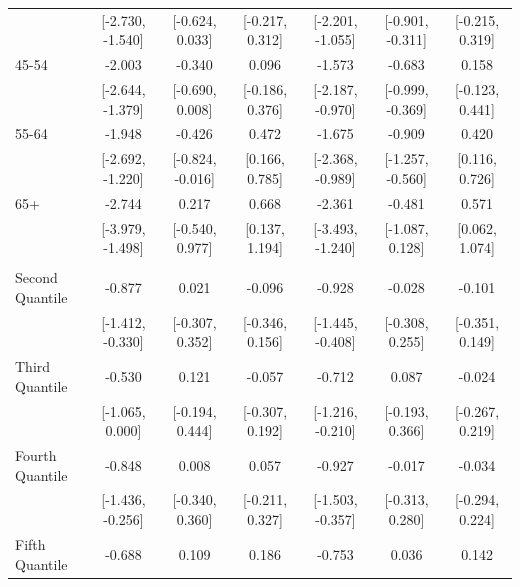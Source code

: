 \documentclass[
  10,
  letterpaper,
  DIV=11,
  numbers=noendperiod]{scrartcl}
\begin{document}
\begin{table}
\begin{tabular}[t]{lcccccc}
\hspace{1em} & {}[-2.730, -1.540] & {}[-0.624, 0.033] & {}[-0.217, 0.312] & {}[-2.201, -1.055] & {}[-0.901, -0.311] & {}[-0.215, 0.319]\\
\hspace{1em}45-54 & -2.003 & -0.340 & 0.096 & -1.573 & -0.683 & 0.158\\
\hspace{1em} & {}[-2.644, -1.379] & {}[-0.690, 0.008] & {}[-0.186, 0.376] & {}[-2.187, -0.970] & {}[-0.999, -0.369] & {}[-0.123, 0.441]\\
\hspace{1em}55-64 & -1.948 & -0.426 & 0.472 & -1.675 & -0.909 & 0.420\\
\hspace{1em} & {}[-2.692, -1.220] & {}[-0.824, -0.016] & {}[0.166, 0.785] & {}[-2.368, -0.989] & {}[-1.257, -0.560] & {}[0.116, 0.726]\\
\hspace{1em}65+ & -2.744 & 0.217 & 0.668 & -2.361 & -0.481 & 0.571\\
\hspace{1em} & {}[-3.979, -1.498] & {}[-0.540, 0.977] & {}[0.137, 1.194] & {}[-3.493, -1.240] & {}[-1.087, 0.128] & {}[0.062, 1.074]\\
\addlinespace[0.3em]
\multicolumn{7}{l}{\cellcolor[HTML]{3498DB}{\textbf{Income}}}\\
\hspace{1em}Second Quantile & -0.877 & 0.021 & -0.096 & -0.928 & -0.028 & -0.101\\
\hspace{1em} & {}[-1.412, -0.330] & {}[-0.307, 0.352] & {}[-0.346, 0.156] & {}[-1.445, -0.408] & {}[-0.308, 0.255] & {}[-0.351, 0.149]\\
\hspace{1em}Third Quantile & -0.530 & 0.121 & -0.057 & -0.712 & 0.087 & -0.024\\
\hspace{1em} & {}[-1.065, 0.000] & {}[-0.194, 0.444] & {}[-0.307, 0.192] & {}[-1.216, -0.210] & {}[-0.193, 0.366] & {}[-0.267, 0.219]\\
\hspace{1em}Fourth Quantile & -0.848 & 0.008 & 0.057 & -0.927 & -0.017 & -0.034\\
\hspace{1em} & {}[-1.436, -0.256] & {}[-0.340, 0.360] & {}[-0.211, 0.327] & {}[-1.503, -0.357] & {}[-0.313, 0.280] & {}[-0.294, 0.224]\\
\hspace{1em}Fifth Quantile & -0.688 & 0.109 & 0.186 & -0.753 & 0.036 & 0.142\\

\end{tabular}
\end{table}
\end{document}
